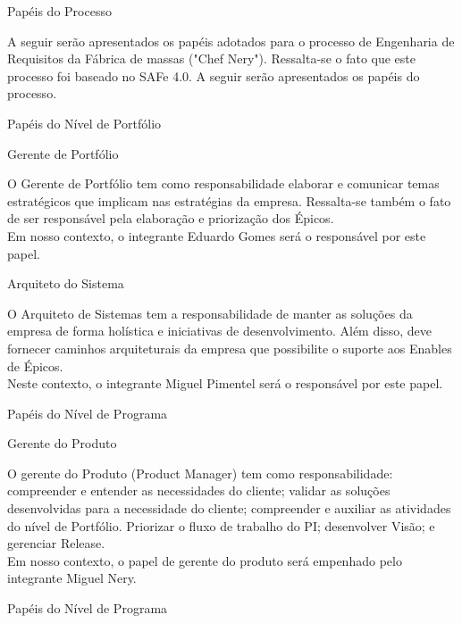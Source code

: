 {
	\large{Papéis do Processo\\}

	\tab A seguir serão apresentados os papéis adotados para o processo de Engenharia de Requisitos da Fábrica de massas ("Chef Nery"). Ressalta-se o fato que este processo foi baseado no SAFe 4.0. A seguir serão apresentados os papéis do processo.\\

}


{\large{Papéis do Nível de Portfólio\\}}

{
	\large{Gerente de Portfólio\\}

	\tab O Gerente de Portfólio tem como responsabilidade elaborar e comunicar temas estratégicos que implicam nas estratégias da empresa. Ressalta-se também o fato de ser responsável pela elaboração e priorização dos Épicos. \\
	\tab Em nosso contexto, o integrante Eduardo Gomes será o responsável por este papel. \\
}


{
	\large{Arquiteto do Sistema\\}

	\tab O Arquiteto de Sistemas tem a responsabilidade de manter as soluções da empresa de forma holística e iniciativas de desenvolvimento. Além disso, deve fornecer caminhos arquiteturais da empresa que possibilite o suporte aos Enables de Épicos. \\
	\tab Neste contexto, o integrante Miguel Pimentel será o responsável por este papel. \\
}

{\large{Papéis do Nível de Programa\\}}

{
	\large{Gerente do Produto\\}

	\tab O gerente do Produto (Product Manager)  tem como responsabilidade: compreender e entender as necessidades do cliente; validar as soluções desenvolvidas para a necessidade do cliente;  compreender e auxiliar as atividades do nível de Portfólio. Priorizar o fluxo de trabalho do PI; desenvolver Visão; e gerenciar Release. \\
	\tab Em nosso contexto, o papel de gerente do produto será empenhado pelo integrante Miguel Nery. \\
 }


{\large{Papéis do Nível de Programa\\}}


